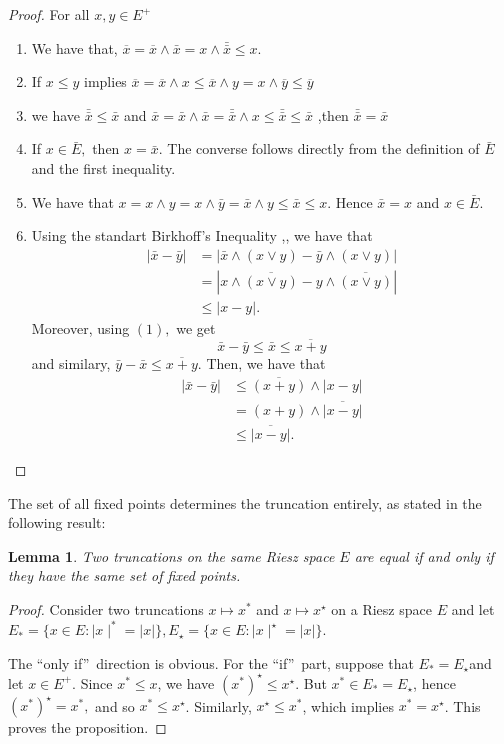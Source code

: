 \documentclass{birkau}
\numberwithin{equation}{section}
\theoremstyle{plain}
\newtheorem{lemma}[theorem]{Lemma}
\theoremstyle{definition}
\begin{document}
\begin{proof}
	For all $x,y\in E^{+}$
	\begin{enumerate}
		\item We have that, $\overline{x}=\overline{x}\wedge\bar{x}=x\wedge\bar
		{\bar{x}}\leq x.$
		\item If $x\leq y$ implies $\overline{x}=\overline{x}\wedge x\leq\overline
		{x}\wedge y=x\wedge\overline{y}\leq\overline{y}$
		\item we have $\bar{\bar{x}}\leq\bar{x}$ and $\bar{x}=\bar
		{x}\wedge\bar{x}=\bar{\bar{x}}\wedge x\leq\bar{\bar{x}}\leq \bar{x}$ ,then $\bar{\bar{x}%
		}=\bar{x}$
		\item If $x\in\bar{E},$ then $x=\bar{x}.$
		The converse follows directly from the definition of $\bar{E}$ and the first inequality.
		\item We have that $x=x\wedge y=x\wedge\bar{y}=\bar{x}\wedge y\leq\bar{x}\leq x$. Hence $\bar{x}=x$ and $x\in\bar{E}$.
		\item Using the standart Birkhoff's Inequality ,\cite[Theorem 1.9]{positiveoperator}, we have
		that
		\begin{align*}
			|\bar{x}-\bar{y}|  & =|\bar{x}\wedge\left(  x\vee y\right)  -\bar{y}%
			\wedge\left(  x\vee y\right)  |\\
			& =|x\wedge\overline{\left(  x\vee y\right)  }-y\wedge\overline{\left(  x\vee
				y\right)  }|\\
			& \leq|x-y|.
		\end{align*}
		Moreover, using $\left(  1\right)  ,$ we get%
		\[
		\bar{x}-\bar{y}\leq\bar{x}\leq\overline{x+y}%
		\]
		and similary, $\bar{y}-\bar{x}\leq\overline{x+y}.$ Then, we have that%
		\begin{align*}
			|\bar{x}-\bar{y}|  & \leq\overline{\left(  x+y\right)  }\wedge|x-y|\\
			& =\left(  x+y\right)  \wedge\overline{|x-y|}\\
			& \leq\overline{|x-y|}.
		\end{align*}
	\end{enumerate}
\end{proof}
The set of all fixed points determines the truncation entirely, as stated in
the following result:
\begin{lemma}
	Two truncations on the same Riesz space $E$ are equal if and only if they have
	the same set of fixed points.
\end{lemma}
\begin{proof}
	Consider two truncations $x\mapsto x^{\ast}$ and $x\mapsto x^{\star}$ on a Riesz
	space $E$ and let $E_{\ast}=\{x\in E:\mid x\mid^{\ast}=\mid x\mid\},E_{\star}=\{x\in
	E:\mid x\mid^{\star}=\mid x\mid\}.$
	
	The \textquotedblleft only if\textquotedblright\ direction is obvious. For the
	\textquotedblleft if\textquotedblright\ part, suppose that $E_{\ast}=E_{\star
	}$and let $x\in E^{+}$. Since $x^{\ast}\leq x$, we have $(x^{\ast})^{\star
	}\leq x^\star$.
	But $x^{\ast}\in E_\ast= E_\star$,  hence $(x^{\ast})^{\star}=x^{\ast},$ and so
	$x^{\ast}\leq x^\star$.
	Similarly,  $x^{\star}\leq x^{\ast}$, which implies $x^{\ast}=x^{\star}$.  This
	proves the proposition.
\end{proof}
\end{document}
